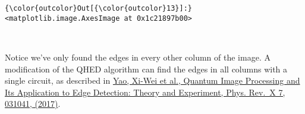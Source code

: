 \documentclass[11pt]{article}
\begin{document}
\begin{Verbatim}[commandchars=\\\{\}]
{\color{outcolor}Out[{\color{outcolor}13}]:} <matplotlib.image.AxesImage at 0x1c21897b00>
\end{Verbatim}
            
    \begin{center}
    \end{center}
    { \hspace*{\fill} \\}
    
    Notice we've only found the edges in every other column of the image. A
modification of the QHED algorithm can find the edges in all columns
with a single circuit, as described in
\href{https://journals.aps.org/prx/abstract/10.1103/PhysRevX.7.031041}{Yao,
Xi-Wei et al., Quantum Image Processing and Its Application to Edge
Detection: Theory and Experiment, Phys. Rev.~X 7, 031041, (2017)}.


    
    
    
    
\end{document}
